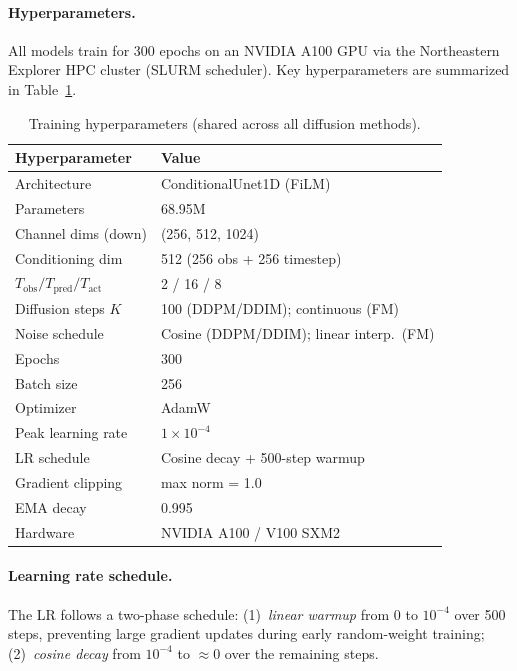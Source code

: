 \documentclass[10pt,letterpaper]{article}
\newcommand{\Tobs}{T_{\text{obs}}}
\newcommand{\Tpred}{T_{\text{pred}}}
\newcommand{\Tact}{T_{\text{act}}}
\begin{document}
\paragraph{Hyperparameters.}
All models train for 300 epochs on an NVIDIA A100 GPU via the Northeastern Explorer
HPC cluster (SLURM scheduler).
Key hyperparameters are summarized in Table~\ref{tab:hparams}.

\begin{table}[h]
  \centering
  \caption{Training hyperparameters (shared across all diffusion methods).}
  \label{tab:hparams}
  \small
  \begin{tabular}{@{}ll@{}}
    \toprule
    \textbf{Hyperparameter} & \textbf{Value} \\
    \midrule
    Architecture            & ConditionalUnet1D (FiLM) \\
    Parameters              & 68.95M \\
    Channel dims (down)     & (256, 512, 1024) \\
    Conditioning dim        & 512 (256 obs + 256 timestep) \\
    $\Tobs / \Tpred / \Tact$ & 2 / 16 / 8 \\
    Diffusion steps $K$     & 100 (DDPM/DDIM); continuous (FM) \\
    Noise schedule          & Cosine (DDPM/DDIM); linear interp.\ (FM) \\
    Epochs                  & 300 \\
    Batch size              & 256 \\
    Optimizer               & AdamW \\
    Peak learning rate      & $1{\times}10^{-4}$ \\
    LR schedule             & Cosine decay + 500-step warmup \\
    Gradient clipping       & max norm = 1.0 \\
    EMA decay               & 0.995 \\
    Hardware                & NVIDIA A100 / V100 SXM2 \\
    \bottomrule
  \end{tabular}
\end{table}

\paragraph{Learning rate schedule.}
The LR follows a two-phase schedule:
(1)~\emph{linear warmup} from 0 to $10^{-4}$ over 500 steps, preventing large
gradient updates during early random-weight training;
(2)~\emph{cosine decay} from $10^{-4}$ to $\approx$0 over the remaining steps.
\end{document}
